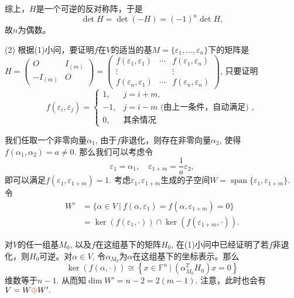 综上，$H$是一个可逆的反对称阵，于是
$$\det H = \det (-H) = (-1)^n \det H,$$
故$n$为偶数。

(2) 根据(1)小问，要证明$f$在$V$的适当的基$M = \{ \varepsilon_1, \ldots, \varepsilon_n \}$下的矩阵是$H = \begin{pmatrix} O & I_{(m)} \\ -I_{(m)} & O \end{pmatrix} = \begin{pmatrix} f(\varepsilon_1, \varepsilon_1) & \cdots & f(\varepsilon_1, \varepsilon_n) \\ \vdots & & \vdots \\ f(\varepsilon_n, \varepsilon_1) & \cdots & f(\varepsilon_n, \varepsilon_n) \end{pmatrix}$, 只要证明
\begin{equation*}
f(\varepsilon_i, \varepsilon_j) = \begin{cases}
1, & j = i + m, \\
-1, & j = i - m \text{ (由上一条件，自动满足) }, \\
0, & \text{其余情况}
\end{cases}
\end{equation*}

我们任取一个非零向量$\alpha_1$, 由于$f$非退化，则存在非零向量$\alpha_2$, 使得$f(\alpha_1, \alpha_2) = a \neq 0$. 那么我们可以考虑令
$$\varepsilon_1 = \alpha_1, \quad \varepsilon_{1+m} = \dfrac{1}{a} \varepsilon_2,$$
即可以满足$f(\varepsilon_1, \varepsilon_{1+m}) = 1$. 考虑$\varepsilon_1, \varepsilon_{1+m}$生成的子空间$W = \operatorname{span} \{\varepsilon_1, \varepsilon_{1+m}\}$. 令
\begin{align*}
W' & = \{ \alpha \in V \ |\ f(\alpha, \varepsilon_1) = f(\alpha, \varepsilon_{1+m}) = 0 \} \\
& = \ker(f(\varepsilon_1, \cdot)) \cap \ker(f(\varepsilon_{1+m}, \cdot)).
\end{align*}

对$V$的任一组基$M_0$, 以及$f$在这组基下的矩阵$H_0$, 在(1)小问中已经证明了若$f$非退化，则$H_0$可逆。对$\alpha \in V$, 令$\alpha_{M_0}$为$\alpha$在这组基下的坐标表示。那么
$$\ker(f(\alpha, \cdot)) \cong \left\{x \in \mathbb{F}^n \ |\ \left( \alpha_{M_0}^T H_0 \right) x = 0 \right\}$$
维数等于$n - 1.$ 从而知$\dim W' = n-2 = 2(m-1)$. 注意，此时也会有$V = W {\color{red}\oplus} W'.$

